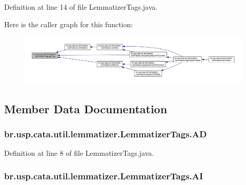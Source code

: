 Definition at line 14 of file Lemmatizer\+Tags.\+java.



Here is the caller graph for this function\+:\nopagebreak
\begin{figure}[H]
\begin{center}
\leavevmode
\includegraphics[width=350pt]{enumbr_1_1usp_1_1cata_1_1util_1_1lemmatizer_1_1_lemmatizer_tags_a0ce6594cb3e0f8eb16b21d1ec5574791_icgraph}
\end{center}
\end{figure}




\subsection{Member Data Documentation}
\hypertarget{enumbr_1_1usp_1_1cata_1_1util_1_1lemmatizer_1_1_lemmatizer_tags_ae7ea3441682e34e3bc0b1d1a03e4b0f9}{
\subsubsection[{A\+D}]{\setlength{\rightskip}{0pt plus 5cm}br.\+usp.\+cata.\+util.\+lemmatizer.\+Lemmatizer\+Tags.\+A\+D}}\label{enumbr_1_1usp_1_1cata_1_1util_1_1lemmatizer_1_1_lemmatizer_tags_ae7ea3441682e34e3bc0b1d1a03e4b0f9}


Definition at line 8 of file Lemmatizer\+Tags.\+java.

\hypertarget{enumbr_1_1usp_1_1cata_1_1util_1_1lemmatizer_1_1_lemmatizer_tags_a744bcaaf15eb088091473e13b5c2128a}{
\subsubsection[{A\+I}]{\setlength{\rightskip}{0pt plus 5cm}br.\+usp.\+cata.\+util.\+lemmatizer.\+Lemmatizer\+Tags.\+A\+I}}\label{enumbr_1_1usp_1_1cata_1_1util_1_1lemmatizer_1_1_lemmatizer_tags_a744bcaaf15eb088091473e13b5c2128a}


